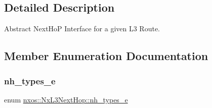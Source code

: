 \subsection{Detailed Description}
Abstract Next\+HoP Interface for a given L3 Route. 

\subsection{Member Enumeration Documentation}
\mbox{\label{classnxos_1_1_nx_l3_next_hop_ab58475e35a53b76cb9bdbfde04d537f3}} 
\subsubsection{\texorpdfstring{nh\+\_\+types\+\_\+e}{nh\_types\_e}}
{\footnotesize\ttfamily enum \mbox{\hyperlink{classnxos_1_1_nx_l3_next_hop_ab58475e35a53b76cb9bdbfde04d537f3}{nxos\+::\+Nx\+L3\+Next\+Hop\+::nh\+\_\+types\+\_\+e}}}

